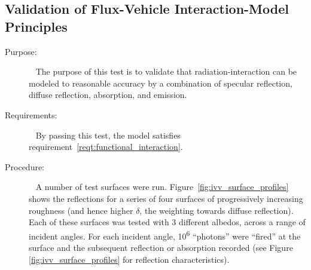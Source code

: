 \subsection{Validation of Flux-Vehicle Interaction-Model Principles}
  \label{test:flux_vehicle_interaction}
  \begin{description}
    \item[Purpose:] \ \newline
      The purpose of this test is to validate that radiation-interaction
      can be modeled to reasonable accuracy by a combination of specular
      reflection, diffuse reflection, absorption, and emission.
    \item[Requirements:] \ \newline
      By passing this test, the model satisfies
      requirement~\ref{reqt:functional_interaction}.
    \item[Procedure:]\ \newline
      A number of test surfaces were run.
      Figure~\ref{fig:ivv_surface_profiles} shows the reflections
      for a series of four surfaces of progressively increasing roughness
      (and hence higher $\delta $, the weighting towards diffuse reflection).
      Each of these surfaces was tested with 3 different
      albedos, across a range of incident angles.  For each
      incident angle, 10\textsuperscript{6} ``photons'' were
      ``fired'' at the surface and the subsequent reflection or absorption
      recorded (see Figure \ref{fig:ivv_surface_profiles} for reflection
			characteristics).


\end{description}
